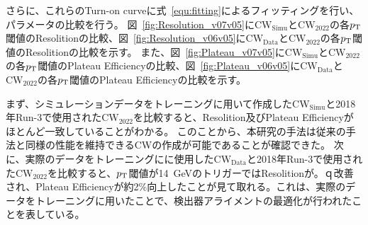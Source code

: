 さらに、これらのTurn-on curveに式~\eqref{equ:fitting}によるフィッティングを行い、パラメータの比較を行う。
図~\ref{fig:Resolution_v07v05}に$\mathrm{CW_{Simu}}$と$\mathrm{CW_{2022}}$の各$p_{\rm{T}}$閾値のResolitionの比較、図~\ref{fig:Resolution_v06v05}に$\mathrm{CW_{Data}}$と$\mathrm{CW_{2022}}$の各$p_{\rm{T}}$閾値のResolitionの比較を示す。
また、図~\ref{fig:Plateau_v07v05}に$\mathrm{CW_{Simu}}$と$\mathrm{CW_{2022}}$の各$p_{\rm{T}}$閾値のPlateau Efficiencyの比較、図~\ref{fig:Plateau_v06v05}に$\mathrm{CW_{Data}}$と$\mathrm{CW_{2022}}$の各$p_{\rm{T}}$閾値のPlateau Efficiencyの比較を示す。

まず、シミュレーションデータをトレーニングに用いて作成した$\mathrm{CW_{Simu}}$と2018年Run-3で使用された$\mathrm{CW_{2022}}$を比較すると、Resolition及びPlateau Efficiencyがほとんど一致していることがわかる。
このことから、本研究の手法は従来の手法と同様の性能を維持できるCWの作成が可能であることが確認できた。
次に、実際のデータをトレーニングにに使用した$\mathrm{CW_{Data}}$と2018年Run-3で使用された$\mathrm{CW_{2022}}$を比較すると、$p_{\rm{T}}$閾値が14~GeVのトリガーではResolitionが。ｑ改善され、Plateau Efficiencyが約2$\%$向上したことが見て取れる。これは、実際のデータをトレーニングに用いたことで、検出器アライメントの最適化が行われたことを表している。

